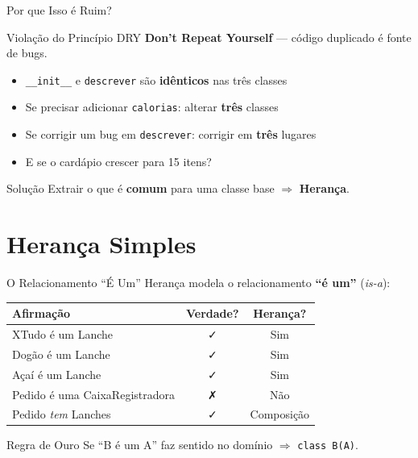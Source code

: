 \documentclass[aspectratio=169]{beamer}
\begin{document}
\begin{frame}{Por que Isso é Ruim?}
  \begin{alertblock}{Violação do Princípio DRY}
    \textbf{Don't Repeat Yourself} — código duplicado é fonte de bugs.
  \end{alertblock}

  \bigskip

  \begin{itemize}
    \item \texttt{\_\_init\_\_} e \texttt{descrever} são \textbf{idênticos} nas três classes
    \item Se precisar adicionar \texttt{calorias}: alterar \textbf{três} classes
    \item Se corrigir um bug em \texttt{descrever}: corrigir em \textbf{três} lugares
    \item E se o cardápio crescer para 15 itens?
  \end{itemize}

  \bigskip

  \begin{exampleblock}{Solução}
    Extrair o que é \textbf{comum} para uma classe base $\Rightarrow$ \textbf{Herança}.
  \end{exampleblock}
\end{frame}

\section{Herança Simples}

\begin{frame}{O Relacionamento ``É Um''}
  Herança modela o relacionamento \textbf{``é um''} (\emph{is-a}):

  \bigskip

  \begin{center}
    \begin{tabular}{lcc}
      \toprule
      \textbf{Afirmação} & \textbf{Verdade?} & \textbf{Herança?} \\
      \midrule
      XTudo é um Lanche           & ✓ & Sim \\
      Dogão é um Lanche           & ✓ & Sim \\
      Açaí é um Lanche            & ✓ & Sim \\
      Pedido é uma CaixaRegistradora & ✗ & Não \\
      Pedido \emph{tem} Lanches   & ✓ & Composição \\
      \bottomrule
    \end{tabular}
  \end{center}

  \bigskip

  \begin{alertblock}{Regra de Ouro}
    Se ``B é um A'' faz sentido no domínio $\Rightarrow$ \texttt{class B(A)}.
  \end{alertblock}
\end{frame}
\end{document}
